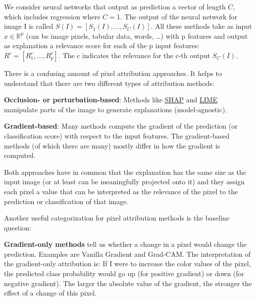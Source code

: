 \documentclass[
  10pt,
]{scrbook}
\begin{document}
We consider neural networks that output as prediction a vector of length \(C\), which includes regression where \(C=1\).
The output of the neural network for image I is called \(S(I)=[S_1(I),\ldots,S_C(I)]\).
All these methods take as input \(x\in\mathbb{R}^p\) (can be image pixels, tabular data, words, \ldots) with p features and output as explanation a relevance score for each of the p input features: \(R^c=[R_1^c,\ldots,R_p^c]\).
The c indicates the relevance for the c-th output \(S_C(I)\).

There is a confusing amount of pixel attribution approaches.
It helps to understand that there are two different types of attribution methods:

\textbf{Occlusion- or perturbation-based}: Methods like \protect\hyperlink{shapux5cux257D}{SHAP} and \protect\hyperlink{lime}{LIME} manipulate parts of the image to generate explanations (model-agnostic).

\textbf{Gradient-based}: Many methods compute the gradient of the prediction (or classification score) with respect to the input features. The gradient-based methods (of which there are many) mostly differ in how the gradient is computed.

Both approaches have in common that the explanation has the same size as the input image (or at least can be meaningfully projected onto it) and they assign each pixel a value that can be interpreted as the relevance of the pixel to the prediction or classification of that image.

Another useful categorization for pixel attribution methods is the baseline question:

\textbf{Gradient-only methods} tell us whether a change in a pixel would change the prediction. Examples are Vanilla Gradient and Grad-CAM.
The interpretation of the gradient-only attribution is:
If I were to increase the color values of the pixel, the predicted class probability would go up (for positive gradient) or down (for negative gradient).
The larger the absolute value of the gradient, the stronger the effect of a change of this pixel.
\end{document}
